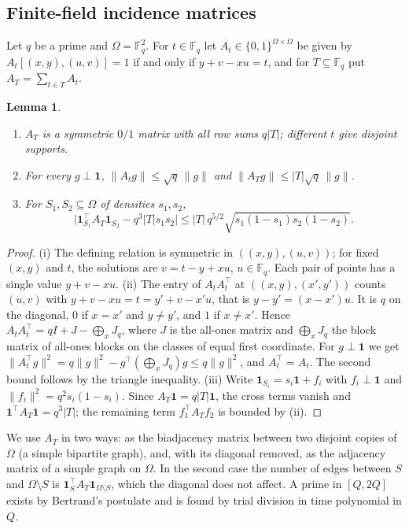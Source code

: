 \documentclass[11pt,letterpaper]{article}
\newtheorem{lemma}[theorem]{Lemma}
\theoremstyle{definition}
\theoremstyle{remark}
\newcommand{\F}{\mathbb F}
\newcommand{\ind}{\mathbf 1}
\begin{document}
\subsection{Finite-field incidence matrices}

Let \(q\) be a prime and \(\Omega=\F_q^2\). For \(t\in\F_q\) let
\(A_t\in\{0,1\}^{\Omega\times\Omega}\) be given by
\(A_t[(x,y),(u,v)]=1\) if and only if \(y+v-xu=t\), and for
\(T\subseteq\F_q\) put \(A_T=\sum_{t\in T}A_t\).

\begin{lemma}\label{lem:incidence}
\begin{enumerate}[label=\textup{(\roman*)}]
\item \(A_T\) is a symmetric \(0/1\) matrix with all row sums \(q|T|\);
different \(t\) give disjoint supports.
\item For every \(g\perp\ind\), \(\|A_tg\|\le\sqrt q\,\|g\|\) and
\(\|A_Tg\|\le|T|\sqrt q\,\|g\|\).
\item For \(S_1,S_2\subseteq\Omega\) of densities \(s_1,s_2\),
\[
\bigl|\ind_{S_1}^{\top}A_T\ind_{S_2}-q^3|T|s_1s_2\bigr|
\le|T|\,q^{5/2}\sqrt{s_1(1-s_1)s_2(1-s_2)}.
\]
\end{enumerate}
\end{lemma}

\begin{proof}
(i) The defining relation is symmetric in \(((x,y),(u,v))\); for fixed
\((x,y)\) and \(t\), the solutions are \(v=t-y+xu\), \(u\in\F_q\). Each
pair of points has a single value \(y+v-xu\).
(ii) The entry of \(A_tA_t^{\top}\) at \(((x,y),(x',y'))\) counts \((u,v)\)
with \(y+v-xu=t=y'+v-x'u\), that is \(y-y'=(x-x')u\). It is \(q\) on the
diagonal, \(0\) if \(x=x'\) and \(y\ne y'\), and \(1\) if \(x\ne x'\). Hence
\(A_tA_t^{\top}=qI+J-\bigoplus_xJ_q\), where \(J\) is the all-ones matrix
and \(\bigoplus_xJ_q\) the block matrix of all-ones blocks on the classes
of equal first coordinate. For \(g\perp\ind\) we get
\(\|A_t^{\top}g\|^2=q\|g\|^2-g^{\top}(\bigoplus_xJ_q)g\le q\|g\|^2\), and
\(A_t^{\top}=A_t\). The second bound follows by the triangle inequality.
(iii) Write \(\ind_{S_i}=s_i\ind+f_i\) with \(f_i\perp\ind\) and
\(\|f_i\|^2=q^2s_i(1-s_i)\). Since \(A_T\ind=q|T|\ind\), the cross terms
vanish and \(\ind^{\top}A_T\ind=q^3|T|\); the remaining term \(f_1^{\top}
A_Tf_2\) is bounded by (ii).
\end{proof}

We use \(A_T\) in two ways: as the biadjacency matrix between two disjoint
copies of \(\Omega\) (a simple bipartite graph), and, with its diagonal
removed, as the adjacency matrix of a simple graph on \(\Omega\). In the
second case the number of edges between \(S\) and \(\Omega\setminus S\) is
\(\ind_S^{\top}A_T\ind_{\Omega\setminus S}\), which the diagonal does not
affect. A prime in \([Q,2Q]\) exists by Bertrand's postulate and is found by
trial division in time polynomial in \(Q\).
\end{document}
